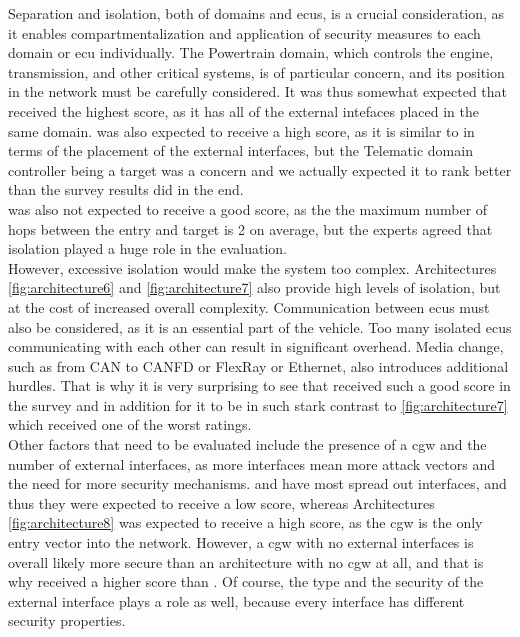 Separation and isolation, both of domains and \gls{ecu}s, is a crucial consideration, as it enables compartmentalization and application of security measures to each domain or \gls{ecu} individually. 
The Powertrain domain, which controls the engine, transmission, and other critical systems, is of particular concern, and its position in the network must be carefully considered. 
It was thus somewhat expected that  received the highest score, as it has all of the external intefaces placed in the same domain.
 was also expected to receive a high score, as it is similar to  in terms of the placement of the external interfaces,
but the Telematic domain controller being a target was a concern and we actually expected it to rank better than the survey results did in the end.\\
 was also not expected to receive a good score, as the the maximum number of hops between the entry and target is 2 on average,
but the experts agreed that isolation played a huge role in the evaluation.\\

However, excessive isolation would make the system too complex. 
Architectures \ref{fig:architecture6} and \ref{fig:architecture7} also provide high levels of isolation, but at the cost of increased overall complexity.
Communication between \gls{ecu}s must also be considered, as it is an essential part of the vehicle. 
Too many isolated \gls{ecu}s communicating with each other can result in significant overhead. 
Media change, such as from CAN to CANFD or FlexRay or Ethernet, also introduces additional hurdles.
That is why it is very surprising to see that  received such a good score in the survey
and in addition for it to be in such stark contrast to \ref{fig:architecture7} which received one of the worst ratings.\\

Other factors that need to be evaluated include the presence of a \gls{cgw} and the number of external interfaces, 
as more interfaces mean more attack vectors and the need for more security mechanisms.
 and  have most spread out interfaces, and thus they were expected to receive a low score,
whereas Architectures \ref{fig:architecture8} was expected to receive a high score, as the \gls{cgw} is the only entry vector into the network.
However, a \gls{cgw} with no external interfaces is overall likely more secure than an architecture with no \gls{cgw} at all, and that is why 
 received a higher score than . 
Of course, the type and the security of the external interface plays a role as well, because every interface has different security properties.\\

